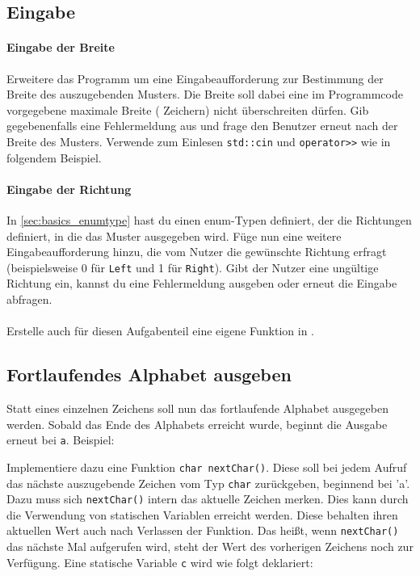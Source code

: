 \subsection{Eingabe}
\paragraph{Eingabe der Breite}
Erweitere das Programm um eine Eingabeaufforderung zur Bestimmung der Breite des auszugebenden Musters.
Die Breite soll dabei eine im Programmcode vorgegebene maximale Breite (\zB {} Zeichern) nicht überschreiten dürfen. 
Gib gegebenenfalls eine Fehlermeldung aus und frage den Benutzer erneut nach der Breite des Musters.
Verwende zum Einlesen \lstinline{std::cin} und \lstinline{operator>>} wie in folgendem Beispiel.

  
\paragraph{Eingabe der Richtung}
In \ref{sec:basics_enumtype} hast du einen enum-Typen definiert, der die Richtungen definiert, in die das Muster ausgegeben wird. 
Füge nun eine weitere Eingabeaufforderung hinzu, die vom Nutzer die gewünschte Richtung erfragt (beispielsweise 0 für \lstinline{Left} und 1 für \lstinline{Right}). 
Gibt der Nutzer eine ungültige Richtung ein, kannst du eine Fehlermeldung ausgeben oder erneut die Eingabe abfragen.\\
\\
Erstelle auch für diesen Aufgabenteil eine eigene Funktion in .

\subsection{Fortlaufendes Alphabet ausgeben}
Statt eines einzelnen Zeichens soll nun das fortlaufende Alphabet ausgegeben werden.
Sobald das Ende des Alphabets erreicht wurde, beginnt die Ausgabe erneut bei \texttt{a}.
Beispiel:


Implementiere dazu eine Funktion \lstinline{char nextChar()}.
Diese soll bei jedem Aufruf das nächste auszugebende Zeichen vom Typ \lstinline{char} zurückgeben, beginnend bei 'a'.
Dazu muss sich \lstinline{nextChar()} intern das aktuelle Zeichen merken.
Dies kann durch die Verwendung von statischen Variablen erreicht werden. 
Diese behalten ihren aktuellen Wert auch nach Verlassen der Funktion. 
Das heißt, wenn \lstinline{nextChar()} das nächste Mal aufgerufen wird, steht der Wert des vorherigen Zeichens noch zur Verfügung.
Eine statische Variable \lstinline{c} wird wie folgt deklariert:

